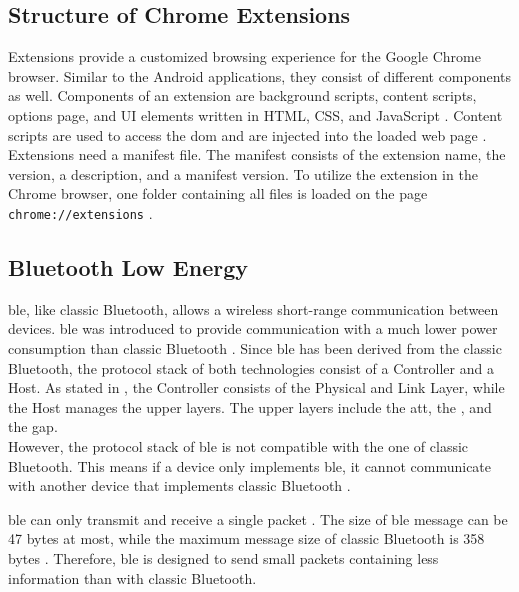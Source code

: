 \subsection*{Structure of Chrome Extensions}
Extensions provide a customized browsing experience for the Google Chrome browser. Similar to the Android applications, they consist of different components as well. Components of an extension are background scripts, content scripts, options page, and UI elements written in HTML, CSS, and JavaScript \cite{Extensions}. Content scripts are used to access the \gls{dom} and are injected into the loaded web page \cite{DBLP:conf/ndss/LiuZYC12}. \\
Extensions need a manifest file. The manifest consists of the extension name, the version, a description, and a manifest version. To utilize the extension in the Chrome browser, one folder containing all files is loaded on the page \texttt{chrome://extensions} \cite{Extensions}.


\subsection*{Bluetooth Low Energy}
\gls{ble}, like classic Bluetooth, allows a wireless short-range communication between devices. \gls{ble} was introduced to provide communication with a much lower power consumption than classic Bluetooth \cite{DBLP:journals/sensors/GomezOP12}. Since \gls{ble} has been derived from the classic Bluetooth, the protocol stack of both technologies consist of a Controller and a Host. As stated in \cite{DBLP:journals/sensors/GomezOP12}, the Controller consists of the Physical and Link Layer, while the Host manages the upper layers. The upper layers include the \gls{att}, the , and the \gls{gap}. \\
However, the protocol stack of \gls{ble} is not compatible with the one of classic Bluetooth. This means if a device only implements \gls{ble}, it cannot communicate with another device that implements classic Bluetooth \cite{DBLP:journals/sensors/GomezOP12}.

\gls{ble} can only transmit and receive a single packet \cite{DBLP:conf/woot/Ryan13}. The size of \gls{ble} message can be 47 bytes at most, while the maximum message size of classic Bluetooth is 358 bytes \cite{DBLP:journals/sensors/GomezOP12}. Therefore, \gls{ble} is designed to send small packets containing less information than with classic Bluetooth.

